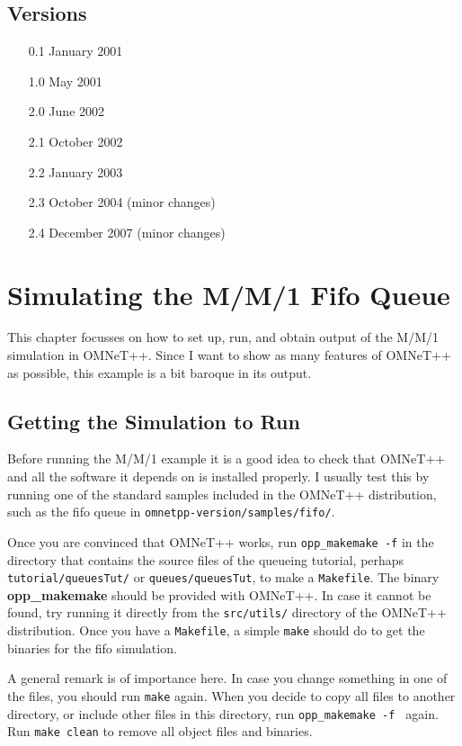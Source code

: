 \documentclass[a4paper]{article}
\begin{document}
\subsection{Versions}
\begin{enumerate}
\item[0.1] January 2001
\item[1.0] May 2001
\item[2.0] June 2002
\item[2.1] October 2002
\item[2.2] January 2003
\item[2.3] October 2004 (minor changes)
\item[2.4] December 2007 (minor changes)
\end{enumerate}

\section{Simulating the M/M/1 Fifo Queue}
\label{sec:simulating-mm1-fifo}


This chapter focusses on how to set up, run, and obtain output of the
M/M/1 simulation in OMNeT++. Since I want to show as many features of
OMNeT++ as possible,  this example is a bit baroque in its output.  


\subsection{Getting the Simulation to Run}
\label{sec:getting-it-running}
Before running the M/M/1 example it is a good idea to check that
OMNeT++ and all the software it depends on is installed properly. I
usually test this by running one of the standard samples included in
the OMNeT++ distribution, such as the fifo queue in
\texttt{omnetpp-version/samples/fifo/}.

Once you are convinced that OMNeT++ works, run \texttt{opp\_makemake
  -f} in the directory that contains the source files of the queueing
tutorial, perhaps \texttt{tutorial/queuesTut/} or
\texttt{queues/queuesTut}, to make a \texttt{Makefile}. The binary
\textbf{opp\_makemake} should be provided with OMNeT++.  In case it
cannot be found, try running it directly from the \texttt{src/utils/}
directory of the OMNeT++ distribution. Once you have a
\texttt{Makefile}, a simple \texttt{make} should do to get the
binaries for the fifo simulation.

A general remark is of importance here. In case you change something
in one of the files, you should run \texttt{make} again. When you
decide to copy all files to another directory, or include other files
in this directory, run \texttt{opp\_makemake -f } again. Run
\texttt{make clean} to remove all object files and binaries.
\end{document}
